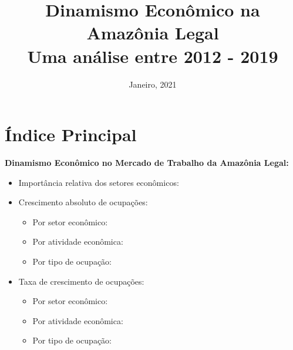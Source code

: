 \documentclass[10pt]{beamer}
\date{Janeiro, 2021}
\title{Dinamismo Econômico na Amazônia Legal \\ Uma análise entre 2012 - 2019}
\begin{document}

\begin{frame}
\titlepage
\end{frame}


\section{Índice Principal}

\begin{frame}[label=indice_principal]{}

\textbf{Dinamismo Econômico no Mercado de Trabalho da Amazônia Legal:}
\vspace{2mm}
\begin{itemize}

\item{Importância relativa dos setores econômicos: \hyperlink{importancia_relativa}{}}
\vspace{1mm}

\item{Crescimento  absoluto de ocupações:
	\begin{itemize}
	\item{Por setor econômico: \hyperlink{rkngnocuporsetor}{}}
	\item{Por atividade econômica: \hyperlink{rkngnocuporatividade}{}}
	\item{Por tipo de ocupação: \hyperlink{rkngnocuporocupacao}{}}
	\end{itemize}
}
\vspace{1mm}

\item{Taxa de crescimento de ocupações:
	\begin{itemize}
	\item{Por setor econômico: \hyperlink{rkngtxocuporsetor}{}}
	\item{Por atividade econômica: \hyperlink{rkngtxocuporatividade}{}}
	\item{Por tipo de ocupação: \hyperlink{rkngtxocuporocupacao}{}}
	\end{itemize}
}
\vspace{1mm}


\end{itemize}
\end{frame}
\end{document}
